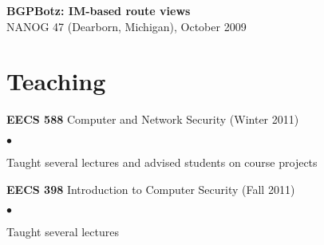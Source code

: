 \documentclass{res}
\newcommand{\sqitem}{\item[\tiny$\blacksquare$]}
\newcommand{\sqlist}{\begin{list}{$\bullet$}
  { \setlength{\itemsep}{0pt}
	\setlength{\parsep}{0pt}
	\setlength{\topsep}{0pt}
	\setlength{\partopsep}{0pt}
	\setlength{\leftmargin}{6.0em}
	\setlength{\labelsep}{2.5em} } }
\newcommand{\sqend}{\end{list}}
\begin{document}
\begin{resume}
    \textbf{BGPBotz: IM-based route views} \\
    NANOG 47 (Dearborn, Michigan), October 2009

\section{Teaching}
    \textbf{EECS 588} Computer and Network Security (Winter 2011)
        \sqlist
        \sqitem Taught several lectures and advised students on course projects
        \sqend

    \textbf{EECS 398} Introduction to Computer Security (Fall 2011)
        \sqlist
        \sqitem Taught several lectures
        \sqend


\end{resume}
\end{document}
